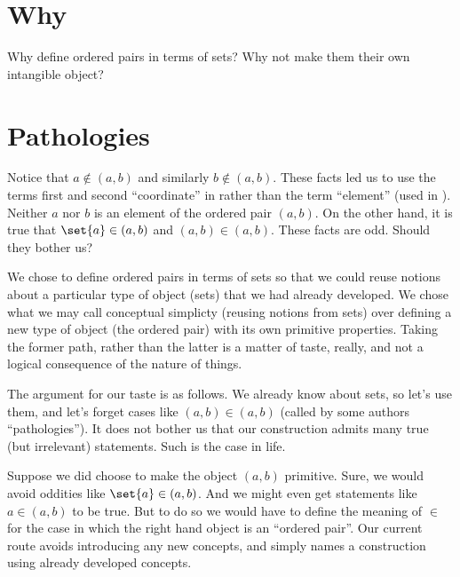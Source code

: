 
\section*{Why}

Why define ordered pairs in terms of sets?
Why not make them their own intangible object?

\section*{Pathologies}

Notice that $a \not\in (a, b)$ and similarly $b \not\in (a, b)$.
These facts led us to use the terms first and second ``coordinate'' in rather than the term ``element'' (used in ).
Neither $a$ nor $b$ is an element of the ordered pair $(a, b)$.
On the other hand, it is true that $\set{a} \in (a, b)$ and $(a, b) \in (a, b)$.
These facts are odd.
Should they bother us?

We chose to define ordered pairs in terms of sets so that we could reuse notions about a particular type of object (sets) that we had already developed.
We chose what we may call conceptual simplicty (reusing notions from sets) over defining a new type of object (the ordered pair) with its own primitive properties.
Taking the former path, rather than the latter is a matter of taste, really, and not a logical consequence of the nature of things.

The argument for our taste is as follows.
We already know about sets, so let's use them, and let's forget cases like $(a, b) \in (a, b)$ (called by some authors ``pathologies'').
It does not bother us that our construction admits many true (but irrelevant) statements.
Such is the case in life.

Suppose we did choose to make the object $(a, b)$ primitive.
Sure, we would avoid oddities like $\set{a} \in (a, b)$.
And we might even get statements like $a \in (a, b)$ to be true.
But to do so we would have to define the meaning of $\in$ for the case in which the right hand object is an ``ordered pair''.
Our current route avoids introducing any new concepts, and simply names a construction using already developed concepts.

\blankpage